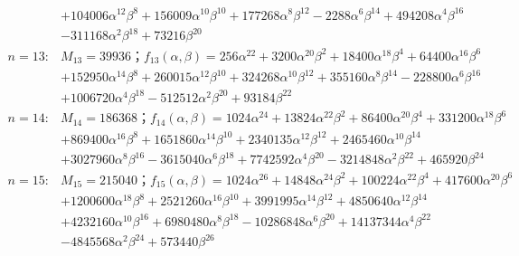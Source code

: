 \begin{flushleft}
\begin{align*}
&+104006\alpha^{12}\beta^{8}+156009\alpha^{10}\beta^{10}+177268\alpha^8\beta^{12}-2288\alpha^6\beta^{14}+494208\alpha^4\beta^{16}\\ &-311168\alpha^2\beta^{18}+73216\beta^{20}\\
n=13:&M_{13}=39936；f_{13}(\alpha,\beta)=256\alpha^{22}+3200\alpha^{20}\beta^2+18400\alpha^{18}\beta^4+64400\alpha^{16}\beta^6\\ 
&+152950\alpha^{14}\beta^{8}+260015\alpha^{12}\beta^{10}+324268\alpha^{10}\beta^{12}+355160\alpha^8\beta^{14}-228800\alpha^6\beta^{16}\\ &+1006720\alpha^4\beta^{18}-512512\alpha^2\beta^{20}+93184\beta^{22} \\
n=14:&M_{14}=186368；f_{14}(\alpha,\beta)=1024\alpha^{24}+13824\alpha^{22}\beta^2+86400\alpha^{20}\beta^4+331200\alpha^{18}\beta^6\\ 
&+869400\alpha^{16}\beta^{8}+1651860\alpha^{14}\beta^{10}+2340135\alpha^{12}\beta^{12}+2465460\alpha^{10}\beta^{14}\\ &+3027960\alpha^8\beta^{16}-3615040\alpha^6\beta^{18}+7742592\alpha^4\beta^{20}-3214848\alpha^2\beta^{22}+465920\beta^{24}\\
n=15:&M_{15}=215040；f_{15}(\alpha,\beta)=1024\alpha^{26}+14848\alpha^{24}\beta^2+100224\alpha^{22}\beta^4+417600\alpha^{20}\beta^6\\ 
&+1200600\alpha^{18}\beta^{8}+2521260\alpha^{16}\beta^{10}+3991995\alpha^{14}\beta^{12}+4850640\alpha^{12}\beta^{14}\\ 
&+4232160\alpha^{10}\beta^{16}+6980480\alpha^8\beta^{18}-10286848\alpha^6\beta^{20}+14137344\alpha^4\beta^{22}\\ 
&-4845568\alpha^2\beta^{24}+573440\beta^{26} \\
\end{align*}
\end{flushleft}
\newpage


